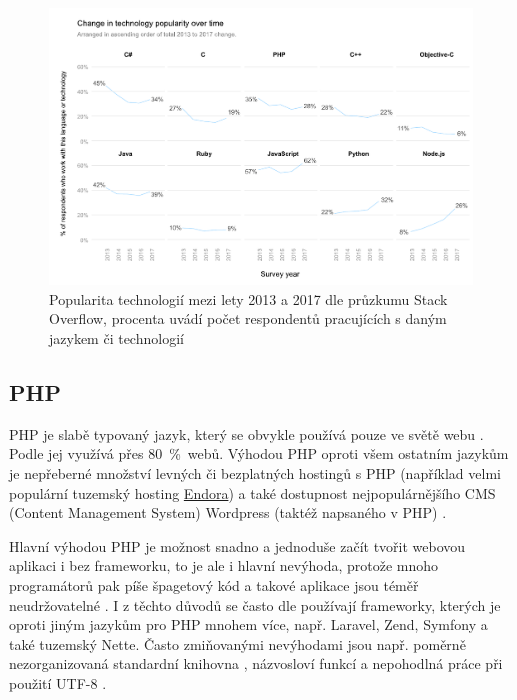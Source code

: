     \begin{figure}\centering
    	\includegraphics[width=1\textwidth]{img/stack-stats}
    	\caption[Popularita technologií mezi lety 2013 a 2017 dle průzkumu Stack Overflow]{Popularita technologií mezi lety 2013 a 2017 dle průzkumu Stack Overflow, procenta uvádí počet respondentů pracujících s daným jazykem či technologií \cite{stack-stats17}}\label{fig:stack-stats17}
    \end{figure}
    
        \subsection{PHP}
        PHP je slabě typovaný jazyk, který se obvykle používá pouze ve světě webu \cite{tech-python1}. Podle \cite{tech-php1} jej využívá přes 80~\%~webů. Výhodou PHP oproti všem ostatním jazykům je nepřeberné množství levných či bezplatných hostingů s PHP \cite{tech-python4} (například velmi populární tuzemský hosting \href{https://www.endora.cz/}{Endora}) a také dostupnost nejpopulárnějšího CMS (Content Management System) Wordpress (taktéž napsaného v PHP) \cite{tech-python2}.
        
        Hlavní výhodou PHP je možnost snadno a jednoduše začít tvořit webovou aplikaci i bez frameworku, to je ale i hlavní nevýhoda, protože mnoho programátorů pak píše špagetový kód a takové aplikace jsou téměř neudržovatelné \cite{tech-php2}. I z těchto důvodů se často dle \cite{tech1} používají frameworky, kterých je oproti jiným jazykům pro PHP mnohem více, např. Laravel, Zend, Symfony a také tuzemský Nette. Často zmiňovanými nevýhodami jsou např. poměrně nezorganizovaná standardní knihovna \cite{tech-python1}, názvosloví funkcí a nepohodlná práce při použití UTF-8 \cite{tech-php3}.
        
